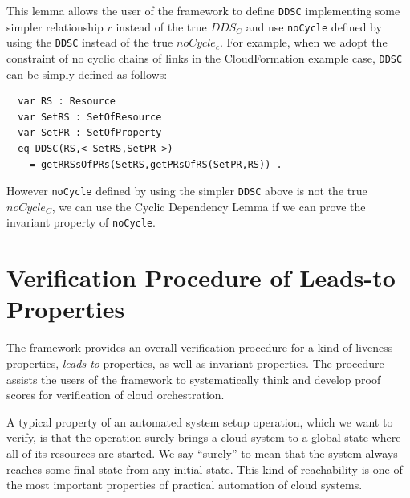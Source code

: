 \documentclass[12pt]{report}
\begin{document}
This lemma allows the user of the framework to define {\tt DDSC}
implementing some simpler relationship $r$ instead of the true $DDS\!_C$
and use {\tt noCycle} defined by using the {\tt DDSC} instead of the true
$noCycle_c$. For example, when we adopt the constraint of no cyclic
chains of links in the CloudFormation example case, {\tt DDSC} can be
simply defined as follows:
\small
\begin{verbatim}
  var RS : Resource
  var SetRS : SetOfResource
  var SetPR : SetOfProperty
  eq DDSC(RS,< SetRS,SetPR >)
    = getRRSsOfPRs(SetRS,getPRsOfRS(SetPR,RS)) .
\end{verbatim}
\normalsize
However {\tt noCycle} defined by using the simpler {\tt DDSC} above is
 not the true $noCycle_C$, we can use the Cyclic Dependency Lemma if
 we can prove the invariant property of {\tt noCycle}.

\chapter{Verification Procedure of Leads-to Properties}
\label{chap:verification}
The framework provides an overall verification procedure for a kind of
liveness properties, {\it leads-to} properties, as well as invariant
properties.  The procedure assists the users of the framework to
systematically think and develop proof scores for verification of
cloud orchestration.

A typical property of an automated system setup operation, which we
want to verify, is that the operation surely brings a cloud system to
a global state where all of its resources are started.  We say ``surely''
to mean that the system always reaches some final state from any
initial state. This kind of reachability is one of the most important
properties of practical automation of cloud systems.
\end{document}
